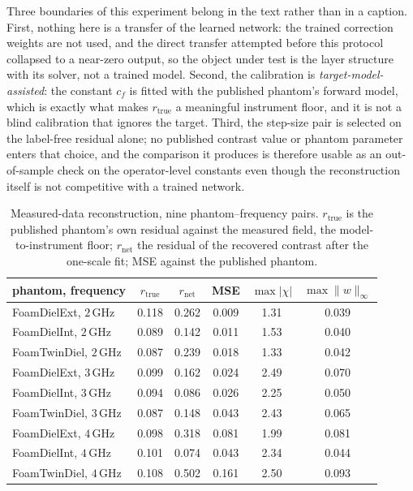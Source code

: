 \documentclass[journal,cmes,article,submit,moreauthors,pdftex]{Definitions/tsp}
\begin{document}
Three boundaries of this experiment belong in the text rather than in a caption. First, nothing
here is a transfer of the learned network: the trained correction weights are not used, and the
direct transfer attempted before this protocol collapsed to a near-zero output, so the object
under test is the layer structure with its solver, not a trained model. Second, the calibration is
\emph{target-model-assisted}: the constant $c_f$ is fitted with the published phantom's forward
model, which is exactly what makes $r_{\mathrm{true}}$ a meaningful instrument floor, and it is not
a blind calibration that ignores the target. Third, the step-size pair is selected on the
label-free residual alone; no published contrast value or phantom parameter enters that choice,
and the comparison it produces is therefore usable as an out-of-sample check on the operator-level
constants even though the reconstruction itself is not competitive with a trained network.

\begin{table}[htbp]
\centering
\caption{Measured-data reconstruction, nine phantom--frequency pairs. $r_{\mathrm{true}}$ is the
published phantom's own residual against the measured field, the model-to-instrument
floor; $r_{\mathrm{net}}$ the residual of the recovered contrast after the one-scale
fit; MSE against the published phantom.}
\label{tab:fresnelrecon}
\small
\setlength{\tabcolsep}{4pt}
\begin{tabular}{lccccc}
\toprule
phantom, frequency & $r_{\mathrm{true}}$ & $r_{\mathrm{net}}$ & MSE & $\max|\chi|$ & $\max\|w\|_\infty$ \\
\midrule
FoamDielExt, $2\,\mathrm{GHz}$  & 0.118 & 0.262 & 0.009 & 1.31 & 0.039 \\
FoamDielInt, $2\,\mathrm{GHz}$  & 0.089 & 0.142 & 0.011 & 1.53 & 0.040 \\
FoamTwinDiel, $2\,\mathrm{GHz}$  & 0.087 & 0.239 & 0.018 & 1.33 & 0.042 \\
FoamDielExt, $3\,\mathrm{GHz}$  & 0.099 & 0.162 & 0.024 & 2.49 & 0.070 \\
FoamDielInt, $3\,\mathrm{GHz}$  & 0.094 & 0.086 & 0.026 & 2.25 & 0.050 \\
FoamTwinDiel, $3\,\mathrm{GHz}$  & 0.087 & 0.148 & 0.043 & 2.43 & 0.065 \\
FoamDielExt, $4\,\mathrm{GHz}$  & 0.098 & 0.318 & 0.081 & 1.99 & 0.081 \\
FoamDielInt, $4\,\mathrm{GHz}$  & 0.101 & 0.074 & 0.043 & 2.34 & 0.044 \\
FoamTwinDiel, $4\,\mathrm{GHz}$  & 0.108 & 0.502 & 0.161 & 2.50 & 0.093 \\
\bottomrule
\end{tabular}
\end{table}
\end{document}
